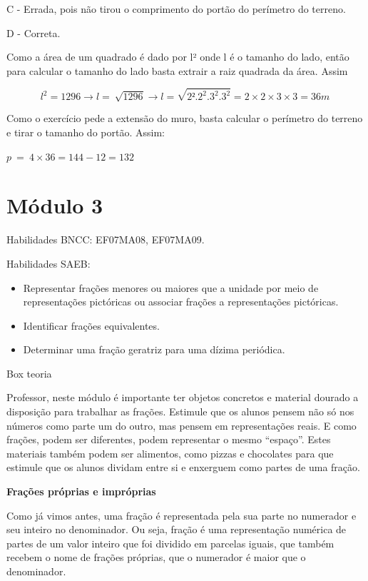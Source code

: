 C - Errada, pois não tirou o comprimento do portão do perímetro do
terreno.

D - Correta.

Como a área de um quadrado é dado por l² onde l é o tamanho do lado,
então para calcular o tamanho do lado basta extrair a raiz quadrada da
área. Assim

\[l^{2} = 1296 \rightarrow l = \ \sqrt{1296} \rightarrow l = \sqrt{2².2^{2}.3^{2}.3^{2}} = 2 \times 2 \times 3 \times 3 = 36m\ \]

Como o exercício pede a extensão do muro, basta calcular o perímetro do
terreno e tirar o tamanho do portão. Assim:

\(p\  = \ 4 \times 36 = 144 - 12 = 132\)

\hypertarget{muxf3dulo-3}{%
\section{Módulo 3}\label{muxf3dulo-3}}

Habilidades BNCC: EF07MA08, EF07MA09.

Habilidades SAEB:

\begin{itemize}
\item
  Representar frações menores ou maiores que a unidade por meio de
  representações pictóricas ou associar frações a representações
  pictóricas.
\item
  Identificar frações equivalentes.
\item
  Determinar uma fração geratriz para uma dízima periódica.
\end{itemize}

Box teoria

Professor, neste módulo é importante ter objetos concretos e material
dourado a disposição para trabalhar as frações. Estimule que os alunos
pensem não só nos números como parte um do outro, mas pensem em
representações reais. E como frações, podem ser diferentes, podem
representar o mesmo ``espaço''. Estes materiais também podem ser
alimentos, como pizzas e chocolates para que estimule que os alunos
dividam entre si e enxerguem como partes de uma fração.

\textbf{Frações próprias e impróprias}

Como já vimos antes, uma fração é representada pela sua parte no
numerador e seu inteiro no denominador. Ou seja, fração é uma
representação numérica de partes de um valor inteiro que foi dividido em
parcelas iguais, que também recebem o nome de frações próprias, que o
numerador é maior que o denominador.

